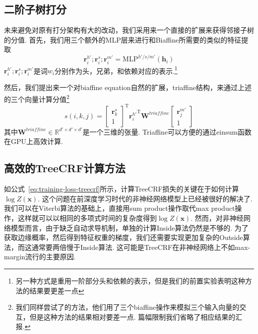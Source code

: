 \subsection{二阶子树打分}
未来避免对原有打分架构有大的改动，我们采用来一个直接的扩展来获得邻接子树的分值.
首先，我们用三个额外的MLP层来进行和Biaffine所需要的类似的特征提取
\begin{equation}
    \label{mlp-sib}
    \mathbf{r}_i^{h'}; \mathbf{r}_i^{s}; \mathbf{r}_i^{m'} =\mathrm{MLP}^{h'/s/m'} \left( \mathbf{h}_i \right)
\end{equation}
$\mathbf{r}_i^{h'}; \mathbf{r}_i^{s}; \mathbf{r}_i^{m'}$是词$w_i$分别作为头，兄弟，和依赖对应的表示.\footnote{
    另一种方式是重用一阶部分头和依赖的表示，但是我们的前置实验表明这种方法的结果要更差一点
}

然后，我们提出来一个对biaffine equation自然的扩展，triaffine结构，来通过上述的三个向量计算分值\footnote{
    我们同样尝试了\cite{wang-etal-2019-second}的方法，他们用了三个biaffine操作来模拟三个输入向量的交互，但是这种方法的结果相对要差一点.
    篇幅限制我们省略了相应结果的汇报.
}
\begin{equation} \label{eq:triaffine}
    s(i,k,j) =
    \left[
        \begin{array}{c}
            \mathbf{r}_{k}^{s} \\
            1
        \end{array}
        \right]^\mathrm{T}
    {\mathbf{r}_{i}^{h'}}^\mathrm{T}
    \mathbf{W}^\textit{triaffine}
    \left[
        \begin{array}{c}
            \mathbf{r}_{j}^{m'} \\
            1
        \end{array}
        \right]
\end{equation}
其中$\mathbf{W}^\textit{triaffine} \in \mathbb{R}^{d' \times d' \times d'}$是一个三维的张量.
Triaffine可以方便的通过$\mathrm{einsum}$函数在GPU上高效计算.

\subsection{高效的TreeCRF计算方法}

如公式~\ref{eq:training-loss-treecrf}所示，计算TreeCRF损失的关键在于如何计算$\log Z(\boldsymbol{x})$.
这个问题在前深度学习时代的非神经网络模型上已经被很好的解决了.
我们可以在Viterbi算法的基础上，直接用sum product操作取代max product操作，这样就可以以相同的多项式时间的复杂度得到$\log Z(\boldsymbol{x})$.
然而，对非神经网络模型而言，由于缺乏自动求导机制，单独的计算Inside算法仍然是不够的.
为了获取边缘概率，然后得到特征权重的梯度，我们还需要实现更加复杂的Outside算法，而这通常要两倍慢于Inside算法.
这可能是TreeCRF在非神经网络上不如max-margin流行的主要原因.

